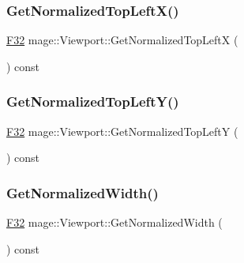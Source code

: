 \subsubsection{\texorpdfstring{Get\+Normalized\+Top\+Left\+X()}{GetNormalizedTopLeftX()}}
{\footnotesize\ttfamily \hyperlink{namespacemage_aa97e833b45f06d60a0a9c4fc22ae02c0}{F32} mage\+::\+Viewport\+::\+Get\+Normalized\+Top\+LeftX (\begin{DoxyParamCaption}{ }\end{DoxyParamCaption}) const\hspace{0.3cm}{\ttfamily [noexcept]}}

\hypertarget{classmage_1_1_viewport_adcf6289a0778f2ed3a75de0b57bf39ec}{}\label{classmage_1_1_viewport_adcf6289a0778f2ed3a75de0b57bf39ec} 
\subsubsection{\texorpdfstring{Get\+Normalized\+Top\+Left\+Y()}{GetNormalizedTopLeftY()}}
{\footnotesize\ttfamily \hyperlink{namespacemage_aa97e833b45f06d60a0a9c4fc22ae02c0}{F32} mage\+::\+Viewport\+::\+Get\+Normalized\+Top\+LeftY (\begin{DoxyParamCaption}{ }\end{DoxyParamCaption}) const\hspace{0.3cm}{\ttfamily [noexcept]}}

\hypertarget{classmage_1_1_viewport_a7a1bdfe9e46fbaa367551e5e04b3a0ff}{}\label{classmage_1_1_viewport_a7a1bdfe9e46fbaa367551e5e04b3a0ff} 
\subsubsection{\texorpdfstring{Get\+Normalized\+Width()}{GetNormalizedWidth()}}
{\footnotesize\ttfamily \hyperlink{namespacemage_aa97e833b45f06d60a0a9c4fc22ae02c0}{F32} mage\+::\+Viewport\+::\+Get\+Normalized\+Width (\begin{DoxyParamCaption}{ }\end{DoxyParamCaption}) const\hspace{0.3cm}{\ttfamily [noexcept]}}

